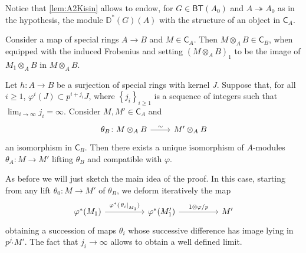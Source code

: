 \begin{rem}[]
	Notice that \cref{lem:A2Kisin} allows to endow,
	for $G \in \mathsf{BT}(A_0)$ and $A \twoheadrightarrow A_0$ as in the hypothesis,
	the module $\mathbb{D}^*(G)(A)$ with the structure of an object in $\mathsf{C}_A$.
\end{rem}


\begin{defn}[]
	Consider a map of special rings $A \to B$ and $M \in \mathsf{C}_A$.
	Then $M \otimes_A B \in \mathsf{C}_B$, when equipped with
	the induced Frobenius %
	and setting
	$\left( M \otimes_A B \right)_1$ to be the image of
	$M_1 \otimes_A B$ in $M \otimes_A B$.
\end{defn}


\begin{lem}\label{lem:A4Kisin}
	Let $h\colon A \to B$ be a surjection of special rings with kernel $J$.
	Suppose that, for all $i \geq 1$, $\varphi^i(J) \subset p^{i + j_i} J$,
	where $\left\{ j_i \right\}_{i \geq 1}$ is a sequence of integers
	such that $\lim_{i \to \infty} j_i = \infty$.
	Consider $M, M' \in \mathsf{C}_A$ and
	\begin{equation*}
	\begin{tikzcd}[row sep = 0ex
		,/tikz/column 1/.append style={anchor=base east}
		,/tikz/column 2/.append style={anchor=base west}]
		\theta_B\colon M \otimes_A B 
		\arrow[r, "\sim", rightarrow] &
		M' \otimes_A B
	\end{tikzcd}
	\end{equation*} 
	an isomorphism in $\mathsf{C}_B$.
	Then there exists a unique isomorphism of $A$-modules
	$\theta_A\colon M \to M'$ lifting $\theta_B$ and compatible with $\varphi$.
\end{lem} 


\begin{rem}[]
	As before we will just sketch the main idea of the proof.
	In this case, starting from any lift $\theta_0\colon M \to M'$
	of $\theta_B$, we deform iteratively the map
	\begin{equation*}
	\begin{tikzcd}[column sep=4.8em]
		\varphi^*(M_1) \arrow[r, "\varphi^*(\left.\theta_i\right|_{ M_1 })", rightarrow] &
		\varphi^*(M_1') \arrow[r, "1 \otimes \varphi/p", rightarrow] &
		M'
	\end{tikzcd}
	\end{equation*}
	obtaining a succession of maps $\theta_i$ whose successive difference
	has image lying in $p^{j_i}M'$.
	The fact that $j_i \to \infty$ allows to obtain a well defined limit.
\end{rem}


